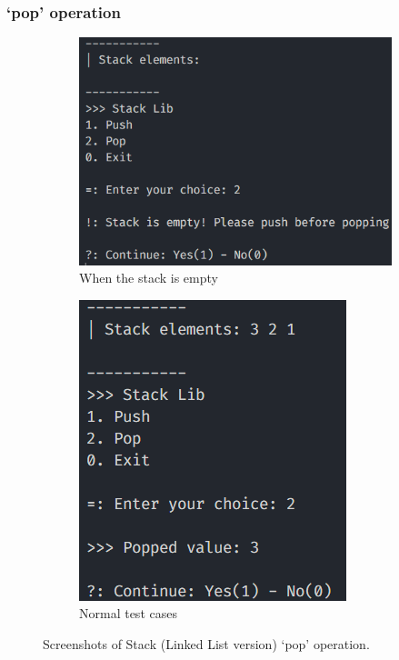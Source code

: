 \subsubsection*{`pop' operation}
\begin{figure}[!ht]
	\centering
	\begin{subfigure}{0.59\textwidth}
		\centering
		\includegraphics[width=\textwidth]{imgs/StackLinkedList/pop/empty.png}
		\caption{When the stack is empty}\label{fig:stack_ll_pop_empty}
	\end{subfigure}
	\hfill
	\begin{subfigure}{0.38\textwidth}
		\centering
		\includegraphics[width=\textwidth]{imgs/StackLinkedList/pop/normal.png}
		\caption{Normal test cases}\label{fig:stack_ll_pop_normal}
	\end{subfigure}
	\caption{Screenshots of Stack (Linked List version) `pop' operation.}\label{fig:stack_ll_pop_cases}
\end{figure}